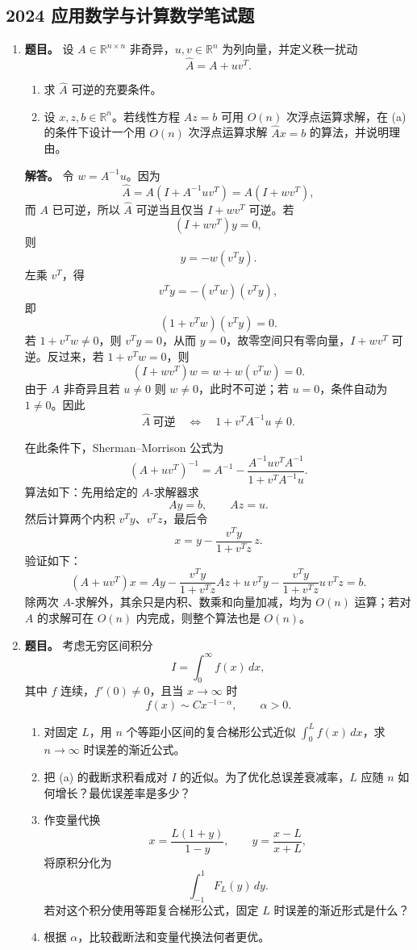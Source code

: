 ﻿\documentclass[UTF8,12pt]{ctexart}
\begin{document}
\subsection{2024 应用数学与计算数学笔试题}
\begin{enumerate}[label=\textbf{\arabic*.},leftmargin=2.2em]
\item \textbf{题目。} 设 \(A\in\mathbb R^{n\times n}\) 非奇异，\(u,v\in\mathbb R^n\) 为列向量，并定义秩一扰动
\[
\widehat A=A+uv^T.
\]
\begin{enumerate}[label=(\alph*),leftmargin=2.0em]
\item 求 \(\widehat A\) 可逆的充要条件。
\item 设 \(x,z,b\in\mathbb R^n\)。若线性方程 \(Az=b\) 可用 \(O(n)\) 次浮点运算求解，在 (a) 的条件下设计一个用 \(O(n)\) 次浮点运算求解 \(\widehat A x=b\) 的算法，并说明理由。
\end{enumerate}

\textbf{解答。} 令 \(w=A^{-1}u\)。因为
\[
\widehat A=A(I+A^{-1}uv^T)=A(I+wv^T),
\]
而 \(A\) 已可逆，所以 \(\widehat A\) 可逆当且仅当 \(I+wv^T\) 可逆。若
\[
(I+wv^T)y=0,
\]
则
\[
y=-w(v^Ty).
\]
左乘 \(v^T\)，得
\[
v^Ty=-(v^Tw)(v^Ty),
\]
即
\[
(1+v^Tw)(v^Ty)=0.
\]
若 \(1+v^Tw\ne0\)，则 \(v^Ty=0\)，从而 \(y=0\)，故零空间只有零向量，\(I+wv^T\) 可逆。反过来，若 \(1+v^Tw=0\)，则
\[
(I+wv^T)w=w+w(v^Tw)=0.
\]
由于 \(A\) 非奇异且若 \(u\ne0\) 则 \(w\ne0\)，此时不可逆；若 \(u=0\)，条件自动为 \(1\ne0\)。因此
\[
\widehat A\ \text{可逆}\quad\Longleftrightarrow\quad
1+v^TA^{-1}u\ne0.
\]

在此条件下，Sherman--Morrison 公式为
\[
(A+uv^T)^{-1}
=A^{-1}-\frac{A^{-1}uv^TA^{-1}}{1+v^TA^{-1}u}.
\]
算法如下：先用给定的 \(A\)-求解器求
\[
Ay=b,\qquad Az=u.
\]
然后计算两个内积 \(v^Ty\)、\(v^Tz\)，最后令
\[
x=y-\frac{v^Ty}{1+v^Tz}\,z.
\]
验证如下：
\[
(A+uv^T)x
=Ay-\frac{v^Ty}{1+v^Tz}Az
+u\,v^Ty-\frac{v^Ty}{1+v^Tz}u\,v^Tz
=b.
\]
除两次 \(A\)-求解外，其余只是内积、数乘和向量加减，均为 \(O(n)\) 运算；若对 \(A\) 的求解可在 \(O(n)\) 内完成，则整个算法也是 \(O(n)\)。

\item \textbf{题目。} 考虑无穷区间积分
\[
I=\int_0^\infty f(x)\,dx,
\]
其中 \(f\) 连续，\(f'(0)\ne0\)，且当 \(x\to\infty\) 时
\[
f(x)\sim Cx^{-1-\alpha},\qquad \alpha>0.
\]
\begin{enumerate}[label=(\alph*),leftmargin=2.0em]
\item 对固定 \(L\)，用 \(n\) 个等距小区间的复合梯形公式近似 \(\int_0^L f(x)\,dx\)，求 \(n\to\infty\) 时误差的渐近公式。
\item 把 (a) 的截断求积看成对 \(I\) 的近似。为了优化总误差衰减率，\(L\) 应随 \(n\) 如何增长？最优误差率是多少？
\item 作变量代换
\[
x=\frac{L(1+y)}{1-y},\qquad y=\frac{x-L}{x+L},
\]
将原积分化为
\[
\int_{-1}^1 F_L(y)\,dy.
\]
若对这个积分使用等距复合梯形公式，固定 \(L\) 时误差的渐近形式是什么？
\item 根据 \(\alpha\)，比较截断法和变量代换法何者更优。
\end{enumerate}


\end{enumerate}
\end{document}
